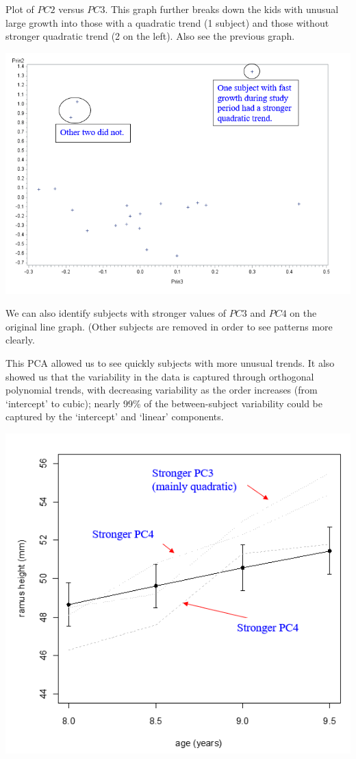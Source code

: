 \documentclass[
  9pt,
  ignorenonframetext,
]{beamer}
\begin{document}
\begin{frame}{}
\protect\hypertarget{section-13}{}
Plot of \(PC2\) versus \(PC3\). This graph further breaks down the kids
with unusual large growth into those with a quadratic trend (1 subject)
and those without stronger quadratic trend (2 on the left). Also see the
previous graph.

\tiny

\begin{center}\includegraphics[width=0.8\linewidth]{figs_L2/f24} \end{center}

\tiny
\end{frame}

\begin{frame}{}
\protect\hypertarget{section-14}{}
We can also identify subjects with stronger values of \(PC3\) and
\(PC4\) on the original line graph. (Other subjects are removed in order
to see patterns more clearly.

This PCA allowed us to see quickly subjects with more unusual trends. It
also showed us that the variability in the data is captured through
orthogonal polynomial trends, with decreasing variability as the order
increases (from `intercept' to cubic); nearly 99\% of the
between-subject variability could be captured by the `intercept' and
`linear' components.

\tiny

\begin{center}\includegraphics[width=0.6\linewidth]{figs_L2/f25} \end{center}

\tiny
\end{frame}
\end{document}
